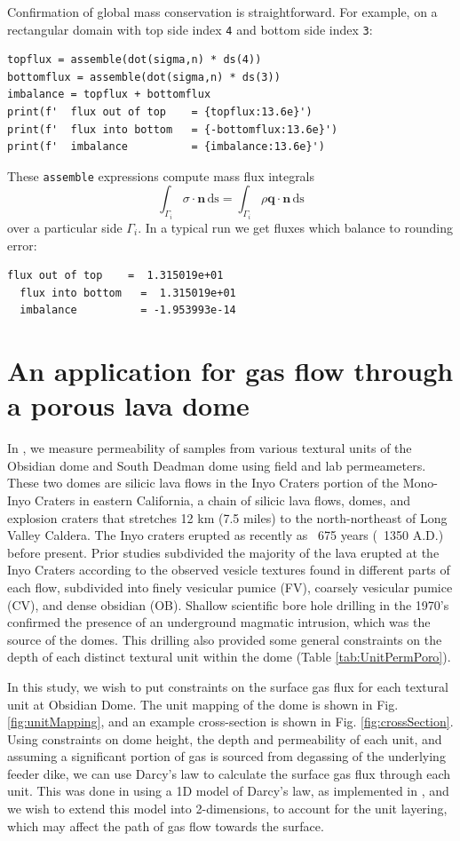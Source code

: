 \documentclass[11pt]{amsart}
\newcommand{\bn}{\mathbf{n}}
\newcommand{\bq}{\mathbf{q}}
\newcommand{\ds}{\mathrm{ds}}
\begin{document}
Confirmation of global mass conservation is straightforward.  For example, on a rectangular domain with top side index \verb|4| and bottom side index \verb|3|:
\begin{Verbatim}[fontsize=\small,frame=lines]
topflux = assemble(dot(sigma,n) * ds(4))
bottomflux = assemble(dot(sigma,n) * ds(3))
imbalance = topflux + bottomflux
print(f'  flux out of top    = {topflux:13.6e}')
print(f'  flux into bottom   = {-bottomflux:13.6e}')
print(f'  imbalance          = {imbalance:13.6e}')
\end{Verbatim}
These \verb|assemble| expressions compute mass flux integrals
    $$\int_{\Gamma_i} \sigma\cdot \bn\,\ds = \int_{\Gamma_i} \rho \bq\cdot \bn\,\ds$$
over a particular side $\Gamma_i$.  In a typical run we get fluxes which balance to rounding error:
\begin{Verbatim}[fontsize=\small,frame=leftline]
  flux out of top    =  1.315019e+01
  flux into bottom   =  1.315019e+01
  imbalance          = -1.953993e-14
\end{Verbatim}


\section{An application for gas flow through a porous lava dome}

In \cite{Graham2023}, we measure permeability of samples from various textural units of the Obsidian dome and South Deadman dome using field and lab permeameters. These two domes are silicic lava flows in the Inyo Craters portion of the Mono-Inyo Craters in eastern California, a chain of silicic lava flows, domes, and explosion craters that stretches 12 km (7.5 miles) to the north-northeast of Long Valley Caldera. The Inyo craters erupted as recently as ~675 years (~1350 A.D.) before present. Prior studies subdivided the majority of the lava erupted at the Inyo Craters according to the observed vesicle textures found in different parts of each flow, subdivided into finely vesicular pumice (FV), coarsely vesicular pumice (CV), and dense obsidian (OB). Shallow scientific bore hole drilling in the 1970's confirmed the presence of an underground magmatic intrusion, which was the source of the domes. This drilling also provided some general constraints on the depth of each distinct textural unit within the dome (Table \ref{tab:UnitPermPoro}).

In this study, we wish to put constraints on the surface gas flux for each textural unit at Obsidian Dome. The unit mapping of the dome is shown in Fig. \ref{fig:unitMapping}, and an example cross-section is shown in Fig. \ref{fig:crossSection}. Using constraints on dome height, the depth and permeability of each unit, and assuming a significant portion of gas is sourced from degassing of the underlying feeder dike, we can use Darcy's law to calculate the surface gas flux through each unit. This was done in \cite{Graham2023} using a 1D model of Darcy's law, as implemented in \cite{Edmonds2003}, and we wish to extend this model into 2-dimensions, to account for the unit layering, which may affect the path of gas flow towards the surface.
\end{document}
